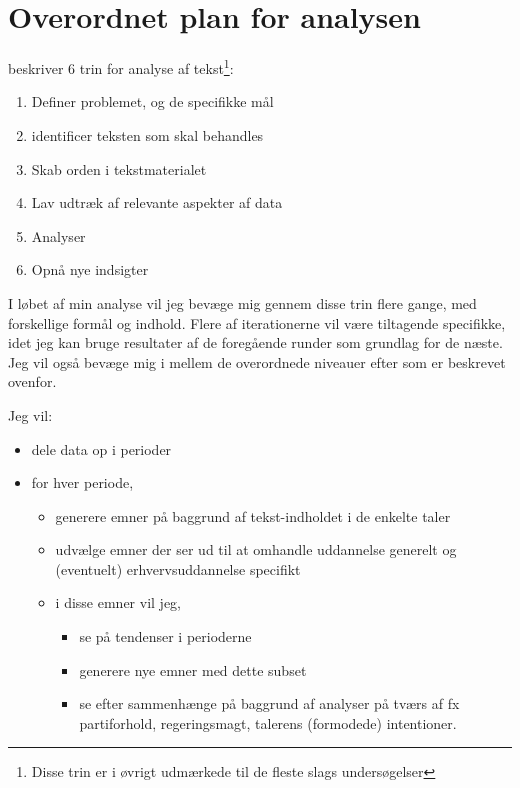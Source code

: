 \section{Overordnet plan for analysen}\label{sec:plan}

\autocite[s. 17]{kwartlerTextMiningPractice2017} beskriver 6 trin for analyse af tekst\footnote{Disse
  trin er i øvrigt udmærkede til de fleste slags undersøgelser}:
\begin{enumerate}
  \item
    Definer problemet, og de specifikke mål
  \item
    identificer teksten som skal behandles
  \item
    Skab orden i tekstmaterialet
  \item
    Lav udtræk af relevante aspekter af data
  \item
    Analyser
  \item
    Opnå nye indsigter
\end{enumerate}

I løbet af min analyse vil jeg bevæge mig gennem disse trin flere gange, med forskellige formål og indhold.
Flere af iterationerne vil være tiltagende specifikke, idet jeg kan bruge resultater af de foregående runder som grundlag for de næste.
Jeg vil også bevæge mig i mellem de overordnede niveauer efter \autocite{evansMachineTranslationMining2016} som er beskrevet ovenfor.

Jeg vil:

\begin{itemize}


  \item
    dele data op i perioder
  \item
    for hver periode,
    \begin{itemize}
      \item
        generere emner på baggrund af tekst-indholdet i de enkelte taler
      \item
        udvælge emner der ser ud til at omhandle uddannelse generelt og (eventuelt) erhvervsuddannelse specifikt
      \item
        i disse emner vil jeg, 
        \begin{itemize}
          \item
            se på tendenser i perioderne
          \item
            generere nye emner med dette subset
          \item
            se efter sammenhænge på baggrund af analyser på tværs af fx partiforhold, regeringsmagt, talerens (formodede) intentioner.
        \end{itemize}
    \end{itemize}
\end{itemize}

